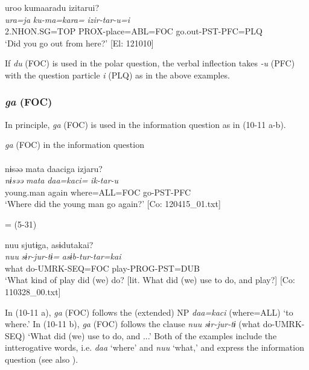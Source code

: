   \ex  %
      \glll    uroo  kumaaradu  izitarui?\\
      \textit{ura=ja}  \textit{ku-ma=kara=}  \textit{izir-tar-u=i}\\
      2.NHON.SG=TOP  PROX-place=ABL=FOC  go.out-PST-PFC=PLQ\\
      \glt       ‘Did you go out from here?’ [El: 121010]
\z
\z

If \textit{du} (FOC) is used in the polar question, the verbal inflection takes \textit{{}-u} (PFC) with the question particle \textit{i} (PLQ) as in the above examples.

\subsubsection{\textit{ga} (FOC)}\label{sec:10.1.2.2}

In principle, \textit{ga} (FOC) is used in the information question as in (10-11 a-b).

\ea\label{ex:10.11}   \textit{ga} (FOC) in the information question\\
  \ea\relax [= (5-34 a)]\\
      \glll    nɨsəə  mata  daaciga  izjaru?\\
      \textit{nɨsəə}  \textit{mata}  \textit{daa=kaci=}  \textit{ik-tar-u}\\
      young.man  again  where=ALL=FOC  go-PST-PFC\\
      \glt       ‘Where did the young man go again?’ [Co: 120415\_01.txt]

  \ex{} = (5-31)

      \glll    nuu  sjutɨga,  asɨdutakai?\\
      \textit{nuu}  \textit{sɨr-jur-tɨ=}  \textit{asɨb-tur-tar=kai}\\
      what  do-UMRK-SEQ=FOC  play-PROG-PST=DUB\\
      \glt       ‘What kind of play did (we) do? [lit. What did (we) use to do, and play?] [Co: 110328\_00.txt]
    \z
\z

In (10-11 a), \textit{ga} (FOC) follows the (extended) NP \textit{daa=kaci} (where=ALL) ‘to where.’ In (10-11 b), \textit{ga} (FOC) follows the clause \textit{nuu} \textit{sɨr-jur-tɨ} (what do-UMRK-SEQ) ‘What did (we) use to do, and ...’ Both of the examples include the intterogative words, i.e. \textit{daa} ‘where’ and \textit{nuu} ‘what,’ and express the information question (see also ).

